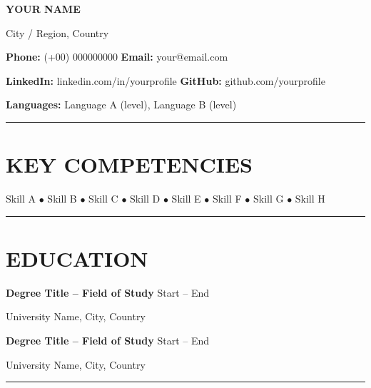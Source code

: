 \documentclass[11pt,a4paper]{article}
\newcommand{\href}[2]{#2}
\newcommand{\sectrule}{\vspace{2pt}\hrule\vspace{3pt}}
\newcommand{\name}[1]{%
  {\Huge\bfseries\color{heading} #1}\par\vspace{4pt}%
}
\newcommand{\cventry}[2]{%
  {\color{heading}\textbf{#1}} \hfill {\color{lighttext}#2}\par%
}
\newcommand{\cvbody}[1]{%
  {\color{body}#1}\par%
}
\begin{document}
\pagestyle{empty}

\name{YOUR NAME}

{\small
\color{lighttext}%
City / Region, Country\par
\color{body}%
\textbf{Phone:} (+00) 000000000 \quad
\textbf{Email:} \href{mailto:your@email.com}{your@email.com}\par
\textbf{LinkedIn:} \href{https://linkedin.com/in/yourprofile}{linkedin.com/in/yourprofile} \quad
\textbf{GitHub:} \href{https://github.com/yourprofile}{github.com/yourprofile}\par
\textbf{Languages:} Language A (level), Language B (level)\par
}

\vspace{3pt}
\sectrule

\section*{KEY COMPETENCIES}

{\color{body}
Skill A $\bullet$ Skill B $\bullet$ Skill C $\bullet$ Skill D $\bullet$ Skill E $\bullet$ Skill F $\bullet$ Skill G $\bullet$ Skill H
}

\vspace{2pt}
\sectrule

\section*{EDUCATION}

\cventry{Degree Title -- Field of Study}{Start -- End}
\cvbody{University Name, City, Country}

\vspace{2pt}

\cventry{Degree Title -- Field of Study}{Start -- End}
\cvbody{University Name, City, Country}

\vspace{2pt}
\sectrule

\end{document}
